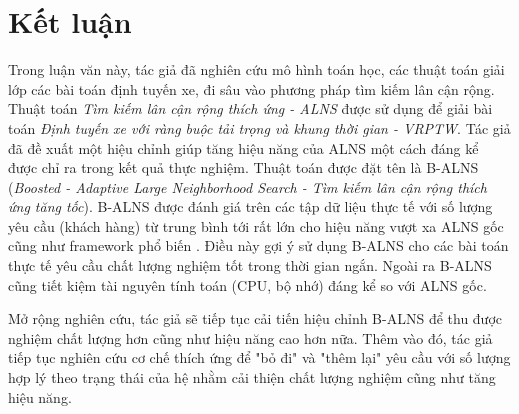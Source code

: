 \chapter{Kết luận}
\label{chap:conclusion}

Trong luận văn này, tác giả đã nghiên cứu mô hình toán học, các thuật toán giải lớp các bài toán định tuyến xe, đi sâu vào phương pháp tìm kiếm lân cận rộng. Thuật toán \textit{Tìm kiếm lân cận rộng thích ứng - ALNS} được sử dụng để giải bài toán \textit{Định tuyến xe với ràng buộc tải trọng và khung thời gian - VRPTW}. Tác giả đã đề xuất một hiệu chỉnh giúp tăng hiệu năng của ALNS một cách đáng kể được chỉ ra trong kết quả thực nghiệm. Thuật toán được đặt tên là B-ALNS (\textit{Boosted - Adaptive Large Neighborhood Search - Tìm kiếm lân cận rộng thích ứng tăng tốc}). B-ALNS được đánh giá trên các tập dữ liệu thực tế với số lượng yêu cầu (khách hàng) từ trung bình tới rất lớn cho hiệu năng vượt xa ALNS gốc cũng như framework phổ biến . Điều này gợi ý sử dụng B-ALNS cho các bài toán thực tế yêu cầu chất lượng nghiệm tốt trong thời gian ngắn. Ngoài ra B-ALNS cũng tiết kiệm tài nguyên tính toán (CPU, bộ nhớ) đáng kể so với ALNS gốc.

Mở rộng nghiên cứu, tác giả sẽ tiếp tục cải tiến hiệu chỉnh B-ALNS để thu được nghiệm chất lượng hơn cũng như hiệu năng cao hơn nữa. Thêm vào đó, tác giả tiếp tục nghiên cứu cơ chế thích ứng để "bỏ đi" và "thêm lại" yêu cầu với số lượng hợp lý theo trạng thái của hệ nhằm cải thiện chất lượng nghiệm cũng như tăng hiệu năng.

